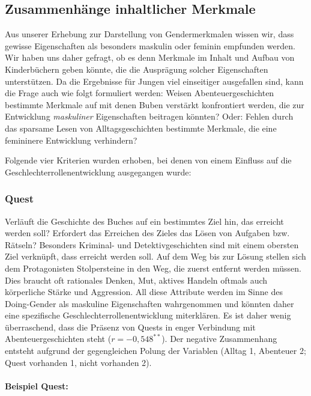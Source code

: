 \subsection{Zusammenhänge inhaltlicher Merkmale}

Aus unserer Erhebung zur Darstellung von Gendermerkmalen wissen wir,
dass gewisse Eigenschaften als besonders maskulin oder feminin empfunden
werden. Wir haben uns daher gefragt, ob es denn Merkmale im Inhalt und
Aufbau von Kinderbüchern geben könnte, die die Ausprägung solcher
Eigenschaften unterstützen. Da die Ergebnisse für Jungen viel
einseitiger ausgefallen sind, kann die Frage auch wie folgt formuliert
werden: Weisen Abenteuergeschichten bestimmte Merkmale auf mit denen
Buben verstärkt konfrontiert werden, die zur Entwicklung
\emph{maskuliner} Eigenschaften beitragen könnten? Oder: Fehlen durch
das sparsame Lesen von Alltagsgeschichten bestimmte Merkmale, die eine
femininere Entwicklung verhindern?

Folgende vier Kriterien wurden erhoben, bei denen von einem Einfluss auf
die Geschlechterrollenentwicklung ausgegangen wurde:

\subsubsection{Quest}

Verläuft die Geschichte des Buches auf ein bestimmtes Ziel hin, das
erreicht werden soll? Erfordert das Erreichen des Zieles das Lösen von
Aufgaben bzw. Rätseln? Besonders Kriminal- und Detektivgeschichten sind
mit einem obersten Ziel verknüpft, dass erreicht werden soll. Auf dem
Weg bis zur Lösung stellen sich dem Protagonisten Stolpersteine in den
Weg, die zuerst entfernt werden müssen. Dies braucht oft rationales
Denken, Mut, aktives Handeln oftmals auch körperliche Stärke und
Aggression. All diese Attribute werden im Sinne des Doing-Gender als
maskuline Eigenschaften wahrgenommen und könnten daher eine spezifische
Geschlechterrollenentwicklung miterklären. Es ist daher wenig
überraschend, dass die Präsenz von Quests in enger Verbindung mit
Abenteuergeschichten steht ($r= -0{,}548^{**}$). Der negative
Zusammenhang entsteht aufgrund der gegengleichen Polung der Variablen
(Alltag 1, Abenteuer 2; Quest vorhanden 1, nicht vorhanden 2).

\paragraph{Beispiel Quest:}

